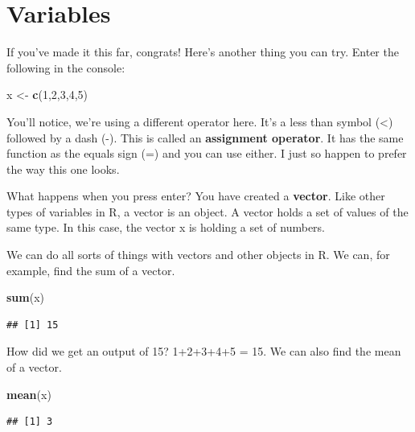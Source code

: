 \documentclass[
]{book}
\newenvironment{Shaded}{\begin{snugshade}}{\end{snugshade}}
\newcommand{\DecValTok}[1]{\textcolor[rgb]{0.00,0.00,0.81}{#1}}
\newcommand{\FunctionTok}[1]{\textcolor[rgb]{0.13,0.29,0.53}{\textbf{#1}}}
\newcommand{\NormalTok}[1]{#1}
\newcommand{\OtherTok}[1]{\textcolor[rgb]{0.56,0.35,0.01}{#1}}
\begin{document}
\hypertarget{variables}{%
\section{Variables}\label{variables}}

If you've made it this far, congrats! Here's another thing you can try. Enter the following in the console:

\begin{Shaded}
\begin{Highlighting}[]
\NormalTok{x }\OtherTok{\textless{}{-}} \FunctionTok{c}\NormalTok{(}\DecValTok{1}\NormalTok{,}\DecValTok{2}\NormalTok{,}\DecValTok{3}\NormalTok{,}\DecValTok{4}\NormalTok{,}\DecValTok{5}\NormalTok{)}
\end{Highlighting}
\end{Shaded}

You'll notice, we're using a different operator here. It's a less than symbol (\textless) followed by a dash (-). This is called an \textbf{assignment operator}. It has the same function as the equals sign (=) and you can use either. I just so happen to prefer the way this one looks.

What happens when you press enter? You have created a \textbf{vector}. Like other types of variables in R, a vector is an object. A vector holds a set of values of the same type. In this case, the vector x is holding a set of numbers.

We can do all sorts of things with vectors and other objects in R. We can, for example, find the sum of a vector.

\begin{Shaded}
\begin{Highlighting}[]
\FunctionTok{sum}\NormalTok{(x)}
\end{Highlighting}
\end{Shaded}

\begin{verbatim}
## [1] 15
\end{verbatim}

How did we get an output of 15? 1+2+3+4+5 = 15. We can also find the mean of a vector.

\begin{Shaded}
\begin{Highlighting}[]
\FunctionTok{mean}\NormalTok{(x)}
\end{Highlighting}
\end{Shaded}

\begin{verbatim}
## [1] 3
\end{verbatim}
\end{document}

